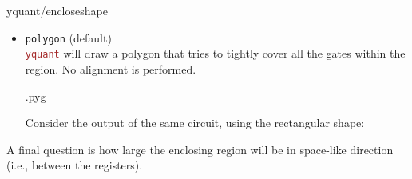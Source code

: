 \documentclass{scrartcl}
\makeatletter
\let\unpatched@minted@inline@iii=\minted@inline@iii%
\def\patched@minted@inline@iii#1{%
      \unpatched@minted@inline@iii{#1}%
      \par%
      \endgroup\egroup\nopagebreak\vskip-\parskip\nopagebreak%
      \noindent\ignorespaces%
   }
\def\patch@mintinline{%
      \let\minted@inline@iii=\patched@minted@inline@iii%
   }
\let\unpatched@RobustMintInlineProcess@ii=\RobustMintInlineProcess@ii
\def\patched@RobustMintInlineProcess@ii#1{%
      \unpatched@RobustMintInlineProcess@ii{#1}%
      \par%
      \endgroup\egroup\nopagebreak\vskip-\parskip\nopagebreak%
      \noindent\ignorespaces%
   }
\def\patch@mintinline{%
      \let\RobustMintInlineProcess@ii=\patched@RobustMintInlineProcess@ii%
   }
\newenvironment{option*}[3][]{\ifhmode\par\fi\addvspace{5mm}%
   \vbox\bgroup\begingroup%
      \patch@mintinline%
      \raggedleft%
      \hspace*{-1cm}%
      \phantomsection\label{yquant:/#2/#3}%
      \texttt{\ifstrempty{#1}\relax{\compat{#1}}\textcolor{gray}{/#2/}\textcolor{mintgreen}{#3}}\hfill default: %
      \tex}{\par\addvspace{5mm}}
\newenvironment{codeexample}{%
   \VerbatimEnvironment%
   \let\FVB@VerbatimOut\minted@FVB@VerbatimOut
   \let\FVE@VerbatimOut\minted@FVE@VerbatimOut
   \minted@configlang{tex}%
   \minted@fvset
   \begin{VerbatimOut}[codes={\catcode`\^^I=12},firstline,lastline]{\minted@jobname.pyg}%
}{
   \end{VerbatimOut}%
   \minted@langlinenoson%
   \savebox\codeexamplebox{ \minted@jobname.pyg}%
   \ifdim\wd\codeexamplebox>\dimexpr.5\linewidth-3mm\relax%
      \wd\codeexamplebox=.5\linewidth%
   \else%
      \wd\codeexamplebox=\dimexpr\wd\codeexamplebox+3mm\relax%
   \fi%
   \noindent\begin{minipage}{\wd\codeexamplebox}%
      \centering%
      \usebox\codeexamplebox%
   \end{minipage}%
   \begin{minipage}{\dimexpr\linewidth-\wd\codeexamplebox\relax}%
      \expandafter\minted@pygmentize\expandafter{\minted@lang}%
   \end{minipage}%
   \minted@langlinenosoff%
   \par%
}
\def\pkg#1{\textcolor{brown}{\texttt{#1}}}
\def\Yquant{\pkg{yquant}}
\makeatother
\begin{document}
\begin{option*}{yquant/enclose}{shape}
\begin{itemize}
                  \item {}\texttt{polygon} (default) \\
                     \Yquant{} will draw a polygon that tries to tightly cover all the gates within the region.
                     No alignment is performed.
                     \begin{example}
                        \begin{codeexample}
                        \end{codeexample}
                        Consider the output of the same circuit, using the rectangular shape:
                        \begin{center}
                        \end{center}
                     \end{example}
               \end{itemize}
            \end{option*}

            A final question is how large the enclosing region will be in space\hyp like direction (i.e., between the registers).
\end{document}
